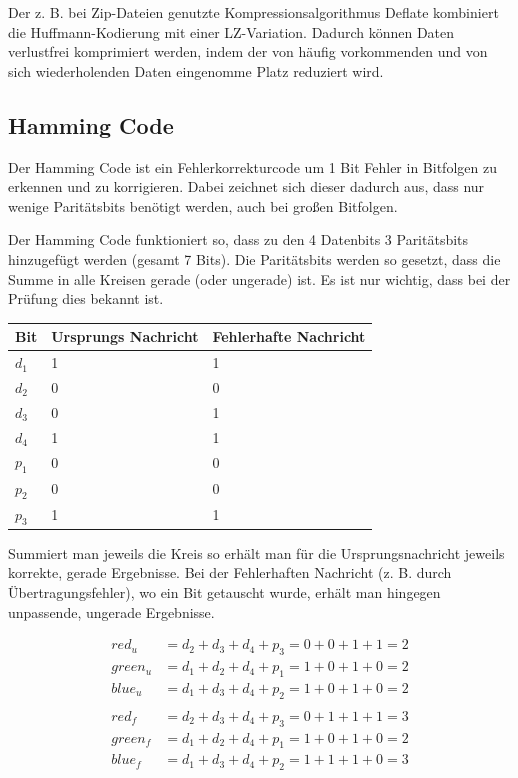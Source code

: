 Der z. B. bei Zip-Dateien genutzte Kompressionsalgorithmus Deflate kombiniert
die Huffmann-Kodierung mit einer LZ-Variation. Dadurch können Daten verlustfrei
komprimiert werden, indem der von häufig vorkommenden und von sich wiederholenden
Daten eingenomme Platz reduziert wird. 

\subsection{Hamming Code}

Der Hamming Code ist ein Fehlerkorrekturcode um 1 Bit Fehler in Bitfolgen
zu erkennen und zu korrigieren. Dabei zeichnet sich dieser dadurch aus,
dass nur wenige Paritätsbits benötigt werden, auch bei großen Bitfolgen.

Der Hamming Code funktioniert so, dass zu den 4 Datenbits 3 Paritätsbits
hinzugefügt werden (gesamt 7 Bits). Die Paritätsbits werden so gesetzt,
dass die Summe in alle Kreisen gerade (oder ungerade) ist. Es ist nur wichtig,
dass bei der Prüfung dies bekannt ist.

\begin{table}[H]
    \begin{tabular}{|l|l|l|}
    \hline
        Bit & Ursprungs Nachricht & Fehlerhafte Nachricht \\ \hline
        $d_1$ & 1 & 1 \\ \hline
        $d_2$ & 0 & 0 \\ \hline
        $d_3$ & 0 & 1 \\ \hline
        $d_4$ & 1 & 1 \\ \hline
        $p_1$ & 0 & 0 \\ \hline
        $p_2$ & 0 & 0 \\ \hline
        $p_3$ & 1 & 1 \\ \hline
    \end{tabular}
\end{table}

Summiert man jeweils die Kreis so erhält man für die Ursprungsnachricht
jeweils korrekte, gerade Ergebnisse. Bei der Fehlerhaften Nachricht (z. B. durch
Übertragungsfehler), wo ein Bit getauscht wurde, erhält man hingegen unpassende,
ungerade Ergebnisse.

\begin{align*}
red_u & = d_2 + d_3 + d_4 + p_3 = 0 + 0 + 1 + 1 = 2 \\
green_u & = d_1 + d_2 + d_4 + p_1 = 1 + 0 + 1 + 0 = 2 \\
blue_u & = d_1 + d_3 + d_4 + p_2 = 1 + 0 + 1 + 0 = 2 \\
& \\
red_f & = d_2 + d_3 + d_4 + p_3 = 0 + 1 + 1 + 1 = 3 \\
green_f & = d_1 + d_2 + d_4 + p_1 = 1 + 0 + 1 + 0 = 2 \\
blue_f & = d_1 + d_3 + d_4 + p_2 = 1 + 1 + 1 + 0 = 3 \\
\end{align*}

